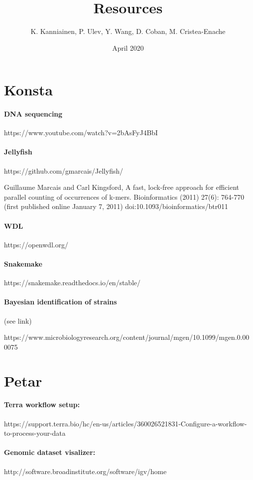 \documentclass{article}
\title{Resources}
\author{K. Kanniainen, P. Ulev, Y. Wang, D. Coban, M. Cristea-Enache}
\date{April 2020}
\begin{document}
\maketitle

\section*{Konsta}
\paragraph{DNA sequencing} https://www.youtube.com/watch?v=2bAsFyJ4BbI
\paragraph{Jellyfish} https://github.com/gmarcais/Jellyfish/
\par Guillaume Marcais and Carl Kingsford, A fast, lock-free approach for efficient parallel counting of occurrences of k-mers. Bioinformatics (2011) 27(6): 764-770 (first published online January 7, 2011) doi:10.1093/bioinformatics/btr011
\paragraph{WDL} https://openwdl.org/
\paragraph{Snakemake} https://snakemake.readthedocs.io/en/stable/
\paragraph{Bayesian identification of strains} (see link)
\par https://www.microbiologyresearch.org/content/journal/mgen/10.1099/mgen.0.000075

\section*{Petar}               
\paragraph{Terra workflow setup:}
https://support.terra.bio/hc/en-us/articles/360026521831-Configure-a-workflow-to-process-your-data 
\paragraph{Genomic dataset visalizer:} http://software.broadinstitute.org/software/igv/home
\end{document}
